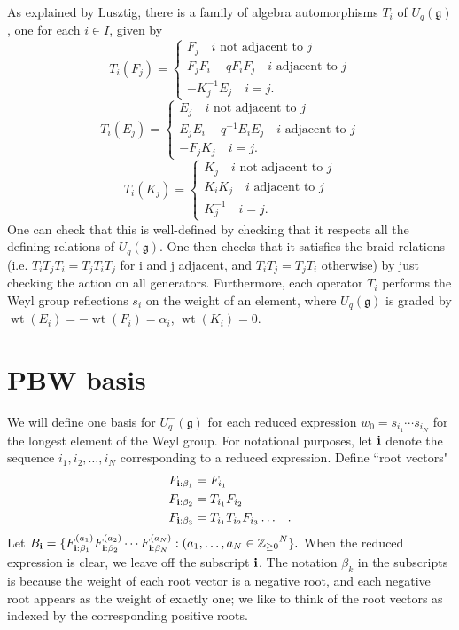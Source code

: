 \documentclass[11pt]{amsart}
\numberwithin{equation}{section}
\theoremstyle{definition}
\newcommand{\g}{\mathfrak{g}}
\DeclareMathOperator{\wt}{wt}
\begin{document}
As explained by Lusztig, there is a family of algebra automorphisms $T_i$ of $U_q(\g)$, one for each $i \in I$, given by
$$
T_i(F_j) =
\begin{cases}
F_j  \quad i \text{ not adjacent to } j \\
F_j F_i - q F_i F_j \quad i \text{ adjacent to } j \\
-K_j^{-1} E_j \quad i=j.  
\end{cases}
$$
$$
T_i(E_j) =
\begin{cases}
E_j  \quad i \text{ not adjacent to } j \\
E_j E_i - q^{-1} E_i E_j \quad i \text{ adjacent to } j \\
-F_j K_j \quad i=j.  
\end{cases}
$$
$$
T_i(K_j) =
\begin{cases}
K_j  \quad i \text{ not adjacent to } j \\
K_i K_j  \quad i \text{ adjacent to } j \\
K_j^{-1} \quad i=j.  
\end{cases}
$$
One can check that this is well-defined by checking that it respects all the defining relations of $U_q(\g)$. One then checks that it satisfies the braid relations 
(i.e. $T_i T_j T_i = T_j T_i T_j$ for i and j adjacent, and $T_i T_j=T_jT_i$ otherwise) by just checking the action on all generators. 
Furthermore, each operator $T_i$ performs the Weyl group reflections $s_i$ on the weight of an element, where $U_q(\g)$ is graded by $\wt(E_i)=-\wt(F_i)= \alpha_i$, $\wt(K_i)=0$. 

\section{PBW basis}
We will define one basis for $U_q^-(\g)$ for each reduced expression $w_0 = s_{i_1} \cdots s_{i_N}$ for the longest element of the Weyl group. For notational purposes, let ${\bf i}$ denote the sequence $i_1, i_2, \ldots, i_N$ corresponding to a reduced expression. Define ``root vectors"
$$
\begin{aligned} 
F_{{\bf i} : \beta_1} & = F_{i_1} \\
F_{{\bf i} : \beta_2} & = T_{i_1}F_{i_2}  \\
F_{{\bf i} :  \beta_3} & = T_{i_1}T_{i_2} F_{i_3}  \ldots \;\;\;.\\
\end{aligned}
$$
Let $B_{\bf i} = \{ F_{{\bf i} :  \beta_1}^{(a_1)} F_{{\bf i} :  \beta_2}^{(a_2)} \cdots F_{{\bf i} :  \beta_N}^{(a_N)} : (a_1, \ldots, a_N \in {\Bbb Z_{\geq 0}}^N \}.$
When the reduced expression is clear, we leave off the subscript ${\bf i}$. The notation $\beta_k$ in the subscripts is because the weight of each root vector is a negative root, and each negative root appears as the weight of exactly one; we like to think of the root vectors as indexed by the corresponding positive roots.
\end{document}

